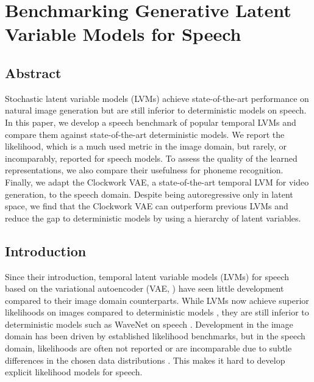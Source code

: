 
\chapter[benchmarking generative latent variable models for speech]{Benchmarking Generative Latent Variable Models for Speech}
\label{chp:benchmarking}

\section{Abstract}
Stochastic latent variable models (LVMs) achieve state-of-the-art performance on natural image generation but are still inferior to deterministic models on speech. In this paper, we develop a speech benchmark of popular temporal LVMs and compare them against state-of-the-art deterministic models. We report the likelihood, which is a much used metric in the image domain, but rarely, or incomparably, reported for speech models. To assess the quality of the learned representations, we also compare their usefulness for phoneme recognition. Finally, we adapt the Clockwork VAE, a state-of-the-art temporal LVM for video generation, to the speech domain. Despite being autoregressive only in latent space, we find that the Clockwork VAE can outperform previous LVMs and reduce the gap to deterministic models by using a hierarchy of latent variables.




\section{Introduction}
Since their introduction, temporal latent variable models (LVMs) for speech \cite{chung_recurrent_2015, fraccaro_sequential_2016} based on the variational autoencoder (VAE,  \textcite{kingma_auto-encoding_2014, rezende_stochastic_2014}) have seen little development compared to their image domain counterparts. While LVMs now achieve superior likelihoods on images compared to deterministic models \cite{child_very_2021,sinha_consistency_2021,kingma_variational_2021}, they are still inferior to deterministic models such as WaveNet on speech \cite{oord_wavenet_2016}.
Development in the image domain has been driven by established likelihood benchmarks, but in the speech domain, likelihoods are often not reported \cite{oord_wavenet_2016, hsu_unsupervised_2017, oord_neural_2018} or are incomparable due to subtle differences in the chosen data distributions \cite{chung_recurrent_2015, fraccaro_sequential_2016, hsu_unsupervised_2017, aksan_stcn_2019}. 
This makes it hard to develop explicit likelihood models for speech.


